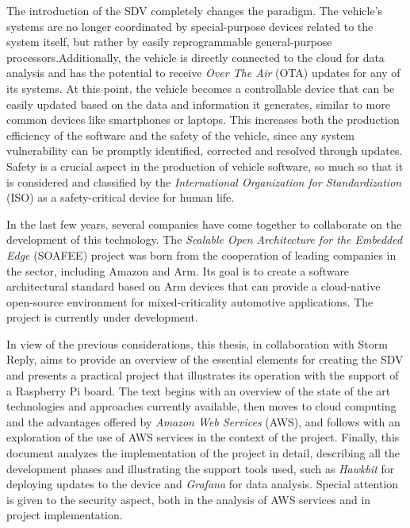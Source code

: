 \documentclass[10pt,a4paper,roman, twocolumn]{article}
\begin{document}
The introduction of the SDV completely changes the paradigm. The vehicle's systems are no longer coordinated by special-purpose devices related to the system itself, but rather by easily reprogrammable general-purpose processors.Additionally, the vehicle is directly connected to the cloud for data analysis and has the potential to receive \textit{Over The Air} (OTA) updates for any of its systems. At this point, the vehicle becomes a controllable device that can be easily updated based on the data and information it generates, similar to more common devices like smartphones or laptops. This increases both the production efficiency of the software and the safety of the vehicle, since any system vulnerability can be promptly identified, corrected and resolved through updates. Safety is a crucial aspect in the production of vehicle software, so much so that it is considered and classified by the \textit{International Organization for Standardization} (ISO) as a safety-critical device for human life.

In the last few years, several companies have come together to collaborate on the development of this technology. The \textit{Scalable Open Architecture for the Embedded Edge} (SOAFEE) project was born from the cooperation of leading companies in the sector, including Amazon and Arm. Its goal is to create a software architectural standard based on Arm devices that can provide a cloud-native open-source environment for mixed-criticality automotive applications. The project is currently under development.

In view of the previous considerations, this thesis, in collaboration with Storm Reply, aims to provide an overview of the essential elements for creating the SDV and presents a practical project that illustrates its operation with the support of a Raspberry Pi board. The text begins with an overview of the state of the art technologies and approaches currently available, then moves to cloud computing and the advantages offered by \textit{Amazon Web Services} (AWS), and follows with an exploration of the use of AWS services in the context of the project. Finally, this document analyzes the implementation of the project in detail, describing all the development phases and illustrating the support tools used, such as \textit{Hawkbit} for deploying updates to the device and \textit{Grafana} for data analysis. Special attention is given to the security aspect, both in the analysis of AWS services and in project implementation.
\end{document}

